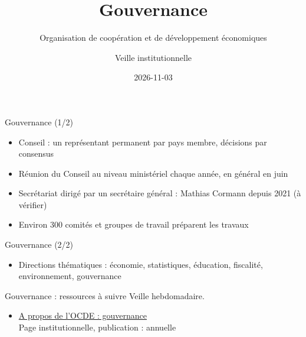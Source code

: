 \documentclass[aspectratio=169,11pt]{beamer}
\title{Gouvernance}
\subtitle{Organisation de coopération et de développement économiques}
\author{Veille institutionnelle}
\date{2026-11-03}
\begin{document}
\begin{frame}\titlepage\end{frame}

\begin{frame}{Gouvernance (1/2)}
\begin{itemize}
\item Conseil : un représentant permanent par pays membre, décisions par consensus
\item Réunion du Conseil au niveau ministériel chaque année, en général en juin
\item Secrétariat dirigé par un secrétaire général : Mathias Cormann depuis 2021 (à vérifier)
\item Environ 300 comités et groupes de travail préparent les travaux
\end{itemize}
\end{frame}

\begin{frame}{Gouvernance (2/2)}
\begin{itemize}
\item Directions thématiques : économie, statistiques, éducation, fiscalité, environnement, gouvernance
\end{itemize}
\end{frame}

\begin{frame}{Gouvernance : ressources à suivre}
\small
Veille hebdomadaire.
\begin{itemize}
\item \href{https://www.oecd.org/en/about.html}{A propos de l'OCDE : gouvernance}\\{\footnotesize Page institutionnelle, publication : annuelle}
\end{itemize}
\end{frame}
\end{document}
